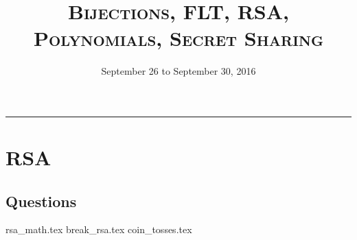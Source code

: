 \documentclass{exam}
\title{\textsc{Bijections, FLT, RSA, Polynomials, Secret Sharing}}
\date{September 26 to September 30, 2016}
\begin{document}
\maketitle
\rule{\textwidth}{0.15em}
\fontsize{12}{15}\selectfont
\thispagestyle{empty}

\section{RSA}
\subsection{Questions}
\begin{questions}
{rsa_math.tex}
{break_rsa.tex}
{coin_tosses.tex}
\end{questions}
\end{document}
